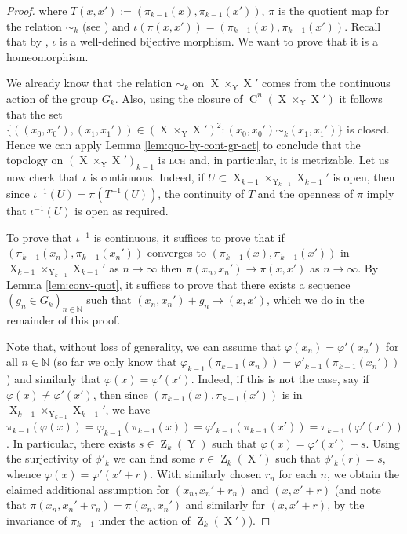 \documentclass[a4paper,12pt,reqno]{amsart}
\theoremstyle{definition}
\def\to{\rightarrow}
\newcommand{\mb}{\mathbb}
\DeclareMathOperator{\ab}{Z}
\DeclareMathOperator{\ns}{X}
\DeclareMathOperator{\nss}{Y}
\DeclareMathOperator{\cu}{C}
\begin{document}
\begin{proof}
\noindent where $T(x,x'):=(\pi_{k-1}(x),\pi_{k-1}(x'))$, $\pi$ is the quotient map for the relation $\sim_k$ (see \cite[Definition 3.2.3]{Cand:Notes1}) and $\iota(\pi(x,x'))=(\pi_{k-1}(x),\pi_{k-1}(x'))$. Recall that by \cite[Proposition A.21]{CGSS-p-hom}, $\iota$ is a well-defined bijective morphism. We want to prove that it is a homeomorphism.

We already know that the relation $\sim_k$ on $\ns \times_{\nss} \ns'$ comes from the continuous action of the group $G_{k}$. Also, using the closure of $\cu^n(\ns \times_{\nss} \ns')$ it follows that the set $\{((x_0,x_0'),(x_1,x_1'))\in (\ns \times_{\nss} \ns')^2: (x_0,x_0')\sim_k(x_1,x_1')\}$ is closed. Hence we can apply Lemma \ref{lem:quo-by-cont-gr-act} to conclude that the topology on $(\ns \times_{\nss} \ns')_{k-1}$ is \textsc{lch} and, in particular, it is metrizable. Let us now check that $\iota$ is continuous. Indeed, if $U\subset \ns_{k-1} \times_{\nss_{k-1}} \ns_{k-1}'$ is open, then since $\iota^{-1}(U)=\pi(T^{-1}(U))$, the continuity of $T$ and the openness of $\pi$ imply that $\iota^{-1}(U)$ is open as required. 

To prove that $\iota^{-1}$ is continuous, it suffices to prove that if $(\pi_{k-1}(x_n),\pi_{k-1}(x_n'))$ converges to $(\pi_{k-1}(x),\pi_{k-1}(x'))$ in $\ns_{k-1}\times_{\nss_{k-1}}\ns_{k-1}'$ as $n\to\infty$ then $\pi(x_n,x_n')\to \pi(x,x')$ as $n\to \infty$. By Lemma \ref{lem:conv-quot}, it suffices to prove that there exists a sequence $(g_n\in G_{k})_{n\in\mb{N}}$ such that $(x_n,x_n')+g_n\to (x,x')$, which we do in the remainder of this proof. 

Note that, without loss of generality, we can assume that $\varphi(x_n)=\varphi'(x_n')$ for all $n\in\mb{N}$ (so far we only know that $\varphi_{k-1}(\pi_{k-1}(x_n))=\varphi'_{k-1}(\pi_{k-1}(x_n'))$) and similarly that $\varphi(x)=\varphi'(x')$. Indeed, if this is not the case, say if $\varphi(x)\not=\varphi'(x')$, then since $(\pi_{k-1}(x),\pi_{k-1}(x'))$ is in $\ns_{k-1}\times_{\nss_{k-1}}\ns_{k-1}'$, we have $\pi_{k-1}(\varphi(x))=\varphi_{k-1}(\pi_{k-1}(x)) = \varphi'_{k-1}(\pi_{k-1}(x'))=\pi_{k-1}(\varphi'(x'))$. In particular, there exists $s\in \ab_k(\nss)$ such that $\varphi(x)=\varphi'(x')+s$. Using the surjectivity of $\phi'_k$ we can find some $r\in \ab_k(\ns')$ such that $\phi'_k(r)=s$, whence  $\varphi(x)=\varphi'(x'+r)$. With similarly chosen $r_n$ for each $n$, we obtain the claimed additional assumption for $(x_n,x_n'+r_n)$ and $(x,x'+r)$ (and note that $\pi(x_n,x_n'+r_n)=\pi(x_n,x_n')$ and similarly for $(x,x'+r)$, by the invariance of $\pi_{k-1}$ under the action of $\ab_k(\ns')$).


\end{proof}
\end{document}
